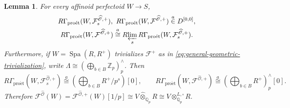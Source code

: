 \documentclass[11pt]{article}
\newtheorem{lemma}[theorem]{Lemma}
\theoremstyle{definition}
\newcommand{\Qp}{\mathbb Q_p}
\newcommand{\Zp}{\mathbb Z_p}
\newcommand{\cF}{\mathcal F}
\newcommand{\proet}{\mathrm{pro\acute et}}
\newcommand{\acong}{\mathrel{\overset{a}{\cong}}}
\newcommand{\ain}{\mathrel{\overset{a}{\in}}}
\begin{document}
\begin{lemma}%
\label{lem:structural-perfectoid-computation}
For every affinoid perfectoid \(W\to S\),
\begin{gather*}
 R\Gamma_{\proet}(W,\mathcal F_s^{\widehat{\mathscr O},+}),\ 
 R\Gamma_{\proet}(W,\mathcal F^{\widehat{\mathscr O},+})
 \ain D^{[0,0]},\\
 R\Gamma_{\proet}(W,\mathcal F^{\widehat{\mathscr O},+})
 \acong R\!\varprojlim_s
 R\Gamma_{\proet}(W,\mathcal F_s^{\widehat{\mathscr O},+}).
\end{gather*}
Furthermore, if \(W=\operatorname{Spa}(R,R^+)\) trivializes
\(\mathcal F^+\) as in \eqref{eq:general-geometric-trivialization},
write
\(\Lambda\cong(\bigoplus_{b\in B}\Zp)^\wedge_p\).  Then
\[
 R\Gamma_{\proet}(W,\mathcal F_s^{\widehat{\mathscr O},+})
 \acong\left(\bigoplus_{b\in B}R^+/p^s\right)[0],\qquad
 R\Gamma_{\proet}(W,\mathcal F^{\widehat{\mathscr O},+})
 \acong\left(\bigoplus_{b\in B}R^+\right)^\wedge_p[0].
\]
Therefore $\cF^{\widehat{\mathscr{O}}}(W)=\mathcal F^{\widehat{\mathscr O},+}(W)[1/p]
 \cong V\widehat\otimes_{\Qp}R
 \cong V\otimes_{\Qp}^{L,\square}R.$
\end{lemma}
\end{document}
